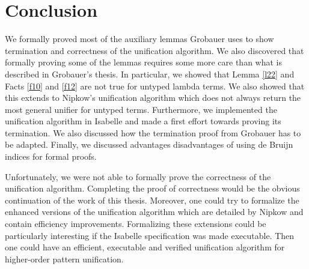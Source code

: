 \chapter{Conclusion}
\label{ch:con}

We formally proved most of the auxiliary lemmas Grobauer \cite{Grobauer} uses to show termination and correctness of the unification algorithm. We also discovered that formally proving some of the lemmas requires some more care than what is described in Grobauer's thesis. In particular, we showed that Lemma \ref{l22} and Facts \ref{f10} and \ref{f12} are not true for untyped lambda terms. We also showed that this extends to Nipkow's \cite{Nipkow-LICS-93} unification algorithm which does not always return the most general unifier for untyped terms. Furthermore, we implemented the unification algorithm in Isabelle and made a first effort towards proving its termination. We also discussed how the termination proof from Grobauer has to be adapted. Finally, we discussed advantages disadvantages of using de Bruijn indices for formal proofs.

Unfortunately, we were not able to formally prove the correctness of the unification algorithm. Completing the proof of correctness would be the obvious continuation of the work of this thesis. Moreover, one could try to formalize the enhanced versions of the unification algorithm which are detailed by Nipkow and contain efficiency improvements. Formalizing these extensions could be particularly interesting if the Isabelle specification was made executable. Then one could have an efficient, executable and verified unification algorithm for higher-order pattern unification.